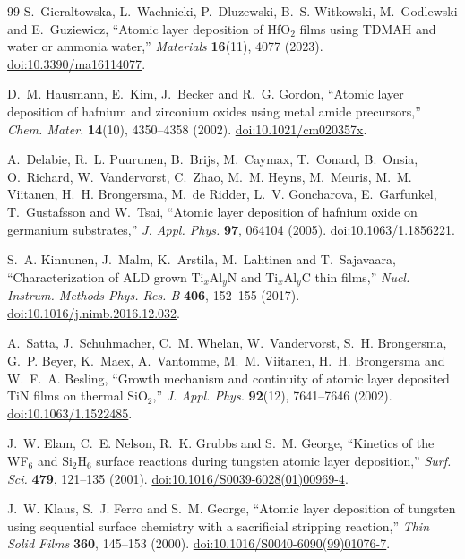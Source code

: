 \documentclass[11pt,letterpaper]{article}
\begin{document}
\begin{thebibliography}{99}
S.~Gieraltowska, L.~Wachnicki, P.~Dluzewski, B.~S. Witkowski, M.~Godlewski and E.~Guziewicz,
``Atomic layer deposition of HfO$_2$ films using TDMAH and water or ammonia water,''
\emph{Materials} \textbf{16}(11), 4077 (2023).
\href{https://doi.org/10.3390/ma16114077}{doi:10.3390/ma16114077}.

D.~M. Hausmann, E.~Kim, J.~Becker and R.~G. Gordon,
``Atomic layer deposition of hafnium and zirconium oxides using metal amide precursors,''
\emph{Chem. Mater.} \textbf{14}(10), 4350--4358 (2002).
\href{https://doi.org/10.1021/cm020357x}{doi:10.1021/cm020357x}.

A.~Delabie, R.~L. Puurunen, B.~Brijs, M.~Caymax, T.~Conard, B.~Onsia, O.~Richard, W.~Vandervorst, C.~Zhao, M.~M. Heyns, M.~Meuris, M.~M. Viitanen, H.~H. Brongersma, M.~de Ridder, L.~V. Goncharova, E.~Garfunkel, T.~Gustafsson and W.~Tsai,
``Atomic layer deposition of hafnium oxide on germanium substrates,''
\emph{J. Appl. Phys.} \textbf{97}, 064104 (2005).
\href{https://doi.org/10.1063/1.1856221}{doi:10.1063/1.1856221}.

S.~A. Kinnunen, J.~Malm, K.~Arstila, M.~Lahtinen and T.~Sajavaara,
``Characterization of ALD grown Ti$_x$Al$_y$N and Ti$_x$Al$_y$C thin films,''
\emph{Nucl. Instrum. Methods Phys. Res. B} \textbf{406}, 152--155 (2017).
\href{https://doi.org/10.1016/j.nimb.2016.12.032}{doi:10.1016/j.nimb.2016.12.032}.

A.~Satta, J.~Schuhmacher, C.~M. Whelan, W.~Vandervorst, S.~H. Brongersma, G.~P. Beyer, K.~Maex, A.~Vantomme, M.~M. Viitanen, H.~H. Brongersma and W.~F.~A. Besling,
``Growth mechanism and continuity of atomic layer deposited TiN films on thermal SiO$_2$,''
\emph{J. Appl. Phys.} \textbf{92}(12), 7641--7646 (2002).
\href{https://doi.org/10.1063/1.1522485}{doi:10.1063/1.1522485}.

J.~W. Elam, C.~E. Nelson, R.~K. Grubbs and S.~M. George,
``Kinetics of the WF$_6$ and Si$_2$H$_6$ surface reactions during tungsten atomic layer deposition,''
\emph{Surf. Sci.} \textbf{479}, 121--135 (2001).
\href{https://doi.org/10.1016/S0039-6028(01)00969-4}{doi:10.1016/S0039-6028(01)00969-4}.

J.~W. Klaus, S.~J. Ferro and S.~M. George,
``Atomic layer deposition of tungsten using sequential surface chemistry with a sacrificial stripping reaction,''
\emph{Thin Solid Films} \textbf{360}, 145--153 (2000).
\href{https://doi.org/10.1016/S0040-6090(99)01076-7}{doi:10.1016/S0040-6090(99)01076-7}.


\end{thebibliography}
\end{document}
